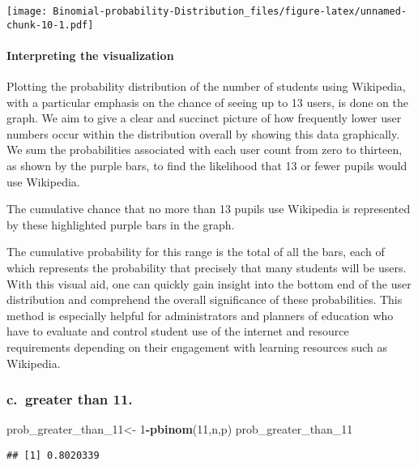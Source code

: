 \documentclass[
]{article}
\newenvironment{Shaded}{\begin{snugshade}}{\end{snugshade}}
\newcommand{\DecValTok}[1]{\textcolor[rgb]{0.00,0.00,0.81}{#1}}
\newcommand{\FunctionTok}[1]{\textcolor[rgb]{0.13,0.29,0.53}{\textbf{#1}}}
\newcommand{\NormalTok}[1]{#1}
\newcommand{\OtherTok}[1]{\textcolor[rgb]{0.56,0.35,0.01}{#1}}
\newcommand{\SpecialCharTok}[1]{\textcolor[rgb]{0.81,0.36,0.00}{\textbf{#1}}}
\begin{document}
\texttt{[image: Binomial-probability-Distribution\_files/figure-latex/unnamed-chunk-10-1.pdf]}

\paragraph{Interpreting the
visualization}\label{interpreting-the-visualization}

Plotting the probability distribution of the number of students using
Wikipedia, with a particular emphasis on the chance of seeing up to 13
users, is done on the graph. We aim to give a clear and succinct picture
of how frequently lower user numbers occur within the distribution
overall by showing this data graphically. We sum the probabilities
associated with each user count from zero to thirteen, as shown by the
purple bars, to find the likelihood that 13 or fewer pupils would use
Wikipedia.

The cumulative chance that no more than 13 pupils use Wikipedia is
represented by these highlighted purple bars in the graph.

The cumulative probability for this range is the total of all the bars,
each of which represents the probability that precisely that many
students will be users. With this visual aid, one can quickly gain
insight into the bottom end of the user distribution and comprehend the
overall significance of these probabilities. This method is especially
helpful for administrators and planners of education who have to
evaluate and control student use of the internet and resource
requirements depending on their engagement with learning resources such
as Wikipedia.

\subsubsection{c.~greater than 11.}\label{c.-greater-than-11.}

\begin{Shaded}
\begin{Highlighting}[]
\NormalTok{prob\_greater\_than\_11}\OtherTok{\textless{}{-}} \DecValTok{1}\SpecialCharTok{{-}}\FunctionTok{pbinom}\NormalTok{(}\DecValTok{11}\NormalTok{,n,p)}
\NormalTok{prob\_greater\_than\_11}
\end{Highlighting}
\end{Shaded}

\begin{verbatim}
## [1] 0.8020339
\end{verbatim}
\end{document}
